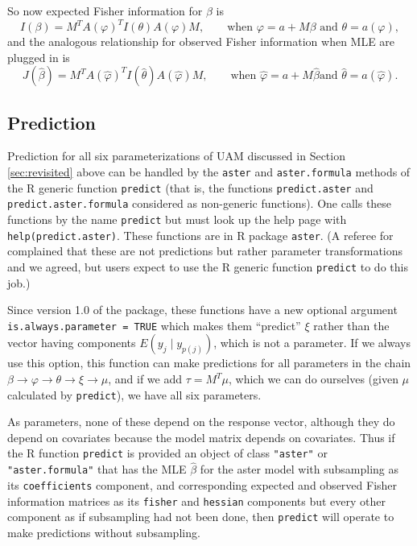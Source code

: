So now expected Fisher information for $\beta$ is
$$
   I(\beta) = M^T A(\varphi)^T I(\theta) A(\varphi) M,
   \qquad \text{when $\varphi = a + M \beta$ and $\theta = a(\varphi)$},
$$
and the analogous relationship for observed Fisher information
when MLE are plugged in is
$$
   J(\hat{\beta})
   =
   M^T A(\hat{\varphi})^T I(\hat{\theta}) A(\hat{\varphi}) M,
   \qquad \text{when $\hat{\varphi} = a + M \hat{\beta}$
   and $\hat{\theta} = a(\hat{\varphi})$}.
$$

\REVISED

\subsection{Prediction}
\label{sec:predict}

Prediction for all six parameterizations of UAM discussed in
Section \ref{sec:revisited} above can be handled by the \texttt{aster}
and \texttt{aster.formula} methods of the R generic function \texttt{predict}
(that is, the functions \texttt{predict.aster}
and \texttt{predict.aster.formula} considered as non-generic functions).
One calls these functions by the name \texttt{predict} but must look up the
help page with \texttt{help(predict.aster)}.
These functions are in R package \texttt{aster}.
(A referee for \citet{aster1} complained that these are not predictions
but rather parameter transformations and we agreed, but users expect to use
the R generic function \texttt{predict} to do this job.)

Since version 1.0 of the package, these functions have a new optional argument
\texttt{is.always.parameter = TRUE} which makes them ``predict'' $\xi$
rather than the vector having components $E(y_j \mid y_{p(j)})$, which
is not a parameter.
If we always use this option, this function can make predictions for all
parameters in the chain $\beta \to \varphi \to \theta \to \xi \to \mu$,
and if we add $\tau = M^T \mu$, which we can do ourselves (given $\mu$
calculated by \texttt{predict}), we have all six parameters.

As parameters, none of these depend on the response vector, although they
do depend on covariates because the model matrix depends on covariates.
Thus if the R function \texttt{predict} is provided an object of class
\texttt{"aster"} or \texttt{"aster.formula"}
that has the MLE $\hat{\beta}$ for the aster model with subsampling
as its \texttt{coefficients} component, and corresponding expected and observed
Fisher information matrices as its \texttt{fisher} and \texttt{hessian}
components but every other component as if subsampling had not been done,
then \texttt{predict} will operate to make predictions without subsampling.

